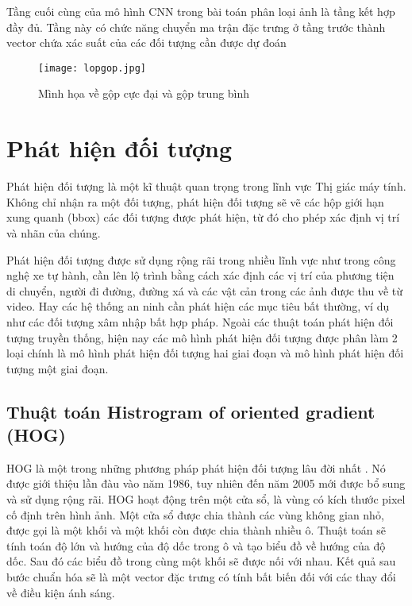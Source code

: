 \documentclass[../the.tex]{subfiles}
\begin{document}
\bigskip

{\fontsize{13}{12} \selectfont
	Tầng cuối cùng của mô hình CNN trong bài toán phân loại ảnh là tầng kết hợp đầy đủ. Tầng này có chức năng chuyển ma trận đặc trưng ở tầng trước thành vector chứa xác suất của các đối tượng cần được dự đoán
}
\begin{figure}[H]
	\centering
	\texttt{[image: lopgop.jpg]}
	\caption{Mình họa về gộp cực đại và gộp trung bình}
	\label{fig:polling}
\end{figure}
\section{Phát hiện đối tượng}
 {\fontsize{13}{12} \selectfont
  Phát hiện đối tượng là một kĩ thuật quan trọng trong lĩnh vực Thị giác máy tính. Không chỉ nhận ra một đối tượng,
  phát hiện đối tượng sẽ vẽ các hộp giới hạn xung quanh (bbox) các đối tượng được phát hiện, từ đó
  cho phép xác định vị trí và nhãn của chúng.
 }

\bigskip

{\fontsize{13}{12} \selectfont
	Phát hiện đối tượng được sử dụng rộng rãi trong nhiều lĩnh vực như trong công nghệ xe tự hành,
	cần lên lộ trình bằng cách xác định các vị trí của phương tiện di chuyển, người đi đường, đường xá và các vật cản trong các ảnh được thu về từ video. Hay các hệ thống an ninh cần phát hiện các mục tiêu bất thường, ví dụ như các đối tượng xâm nhập bất hợp pháp.
	Ngoài các thuật toán phát hiện đối tượng truyền thống, hiện nay các mô hình phát hiện đối tượng được phân làm 2 loại chính là mô hình phát hiện đối tượng hai giai đoạn và mô hình phát hiện đối tượng một giai đoạn.
}
\subsection{Thuật toán Histrogram of oriented gradient (HOG)}
{\fontsize{13}{12} \selectfont
	HOG là một trong những phương pháp phát hiện đối tượng lâu đời nhất \cite{dalal2005histograms}. Nó được giới thiệu lần đàu vào năm 1986,
	tuy nhiên đến năm 2005 mới được bổ sung và sử dụng rộng rãi. HOG hoạt động trên một cửa sổ, là vùng có kích thước pixel cố định trên hình ảnh. Một cửa sổ được chia thành các vùng không gian nhỏ, được gọi là một khối và một khối còn được chia thành nhiều ô.
	Thuật toán sẽ tính toán độ lớn và hướng của độ dốc trong ô và tạo biểu đồ về hướng của độ dốc. Sau đó các biểu đồ trong cùng một khối sẽ được nối với nhau.
	Kết quả sau bước chuẩn hóa sẽ là một vector đặc trưng có tính bất biến đối với các thay đổi về điều kiện ánh sáng.
}
\end{document}

